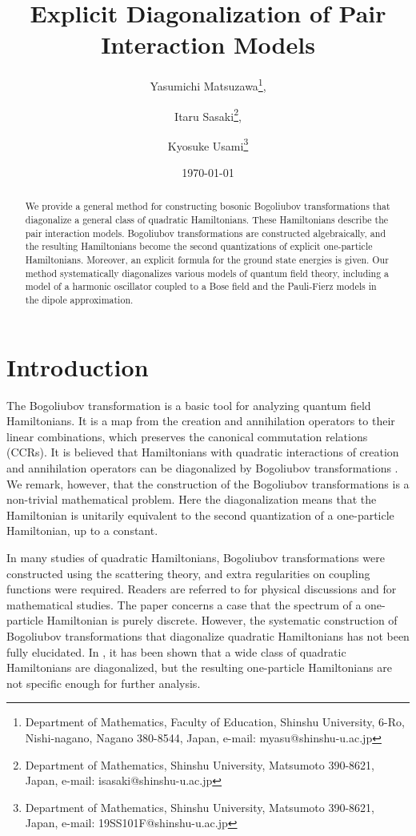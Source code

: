\documentclass[12pt,draft]{article}
\title{\sc Explicit Diagonalization of Pair Interaction Models}
\author{Yasumichi Matsuzawa\thanks{Department of Mathematics, Faculty of Education, Shinshu University,
        6-Ro, Nishi-nagano, Nagano 380-8544, Japan,
        e-mail: myasu@shinshu-u.ac.jp},
\and
        Itaru Sasaki\thanks{Department of Mathematics, Shinshu University, Matsumoto 390-8621, Japan, 
        e-mail: isasaki@shinshu-u.ac.jp},
\and 
        Kyosuke Usami\thanks{Department of Mathematics, Shinshu University, Matsumoto 390-8621, Japan,
        e-mail: 19SS101F@shinshu-u.ac.jp}
}
\date{\today}
\theoremstyle{plain}
\numberwithin{equation}{section}
\theoremstyle{remark}
\begin{document}
\maketitle       %



\begin{abstract}
We provide a general method for constructing bosonic Bogoliubov transformations that diagonalize
 a general class of quadratic Hamiltonians.
These Hamiltonians describe the pair interaction models.
Bogoliubov transformations are constructed algebraically, and the resulting Hamiltonians 
become the second quantizations of explicit one-particle Hamiltonians.
Moreover, an explicit formula for the ground state energies is given. 
Our method systematically diagonalizes various models of quantum field theory,
 including a model of a harmonic oscillator coupled to a Bose field and the Pauli-Fierz models
 in the dipole approximation.
\end{abstract}

\tableofcontents %

\section{Introduction}\label{intro}
The Bogoliubov transformation is a basic tool for analyzing quantum field Hamiltonians.
It is a map from the creation and annihilation operators 
to their linear combinations, which preserves the canonical commutation relations (CCRs).
It is believed that Hamiltonians with quadratic interactions of creation and annihilation
operators can be diagonalized by Bogoliubov transformations \cite{Be}.
We remark, however, that the construction of the Bogoliubov transformations is a non-trivial mathematical problem.
Here the diagonalization means that the Hamiltonian is unitarily equivalent to the second quantization of a one-particle Hamiltonian, 
up to a constant.

In many studies of quadratic Hamiltonians, Bogoliubov transformations were constructed using the scattering theory, 
and extra regularities on coupling functions were required.
Readers are referred to \cite{KM} for physical discussions and \cite{Ar81, A83, A83b, AF, EB} for mathematical studies.
The paper \cite{GS} concerns a case that the spectrum of a one-particle Hamiltonian is purely discrete.
However, the systematic construction of Bogoliubov transformations that diagonalize quadratic 
Hamiltonians has not been fully elucidated.
In \cite{De17,TNS}, it has been shown that a wide class of quadratic Hamiltonians are diagonalized, 
but the resulting one-particle Hamiltonians are not specific enough for further analysis.
\end{document}
